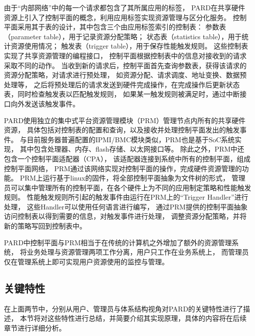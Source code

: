 由于``内部网络''中的每一个请求都包含了其所属应用的标签，
PARD在共享硬件资源上引入了控制平面的概念，利用应用标签实现资源管理与区分化服务。
控制平面采用其于表的设计，其中包含三个由应用标签索引的控制表：
参数表（parameter table），用于记录资源分配策略；
状态表（statistics table），用于统计资源使用情况；
触发表（trigger table），用于保存性能触发规则。
这些控制表实现了共享资源管理的编程接口，
控制平面根据控制表中的信息对接收到的请求采取不同的动作。
当收到新的请求后，控制平面首先查询参数表，获得该请求的资源分配策略，对请求进行预处理，
如资源分配、请求调度、地址变换、数据预处理等，
之后将预处理后的请求发送到硬件完成操作，在完成操作后更新状态表，同时检查触发表以匹配触发规则，
如果某一触发规则被满足时，通过中断接口向外发送该触发事件。

PARD使用独立的集中式平台资源管理模块（PRM）管理节点内所有的共享硬件资源，
具体包括对控制表的配置和查询，以及接收并处理控制平面发出的触发事件。
与目前服务器普遍配置的IPMI/BMC模块类似，PRM也是基于SoC系统实现，
其中包含处理器、内存、flash存储、以太网接口等。
除此之外，PRM中还包含一个控制平面适配器（CPA），
该适配器连接到系统中所有的控制平面，组成控制平面网络，
PRM通过该网络实现对控制平面的操作，完成硬件资源管理的功能。
PRM上运行基于linux的固件，将全部控制平面抽象为文件树的形式，
管理员可以集中管理所有的控制平面，在各个硬件上为不同的应用制定策略和性能触发规则。
性能触发规则所引起的触发事件由运行在PRM上的``Trigger Handler''进行处理，
这些Handler可以使用任何语言进行编写，
通过PRM提供的控制平面抽象访问控制表以得到需要的信息，对触发事件进行处理，
调整资源分配策略，并将新的策略写回到控制表中。

PARD中控制平面与PRM相当于在传统的计算机之外增加了额外的资源管理系统，
将业务处理与资源管理两项工作分离，用户只工作在业务系统上，
而管理员仅在管理系统上即可实现用户资源使用的监控与管理。


\subsection{关键特性}

在上面两节中，分别从用户、管理员与体系结构视角对PARD的关键特性进行了描述，
本节将对这些特性进行总结，并简要介绍其实现原理，具体的内容将在后续章节进行详细分析。

